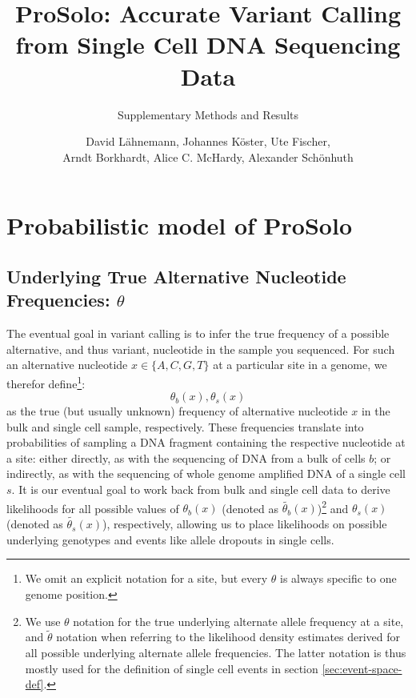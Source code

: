\documentclass[authoryear,preprint,11pt]{scrartcl}
\begin{document}
\title{ProSolo: Accurate Variant Calling from Single Cell DNA Sequencing Data}
\subtitle{Supplementary Methods and Results}

\author{David Lähnemann, Johannes Köster, Ute Fischer, \\ Arndt Borkhardt, Alice C. McHardy, Alexander Schönhuth}

\maketitle

\tableofcontents

\section{Probabilistic model of ProSolo}

\subsection{Underlying True Alternative Nucleotide Frequencies: $\theta$}
\label{sec.afs}

The eventual goal in variant calling is to infer the true frequency of a possible alternative, and thus variant, nucleotide in the sample you sequenced.
For such an alternative nucleotide $x\in\{A,C,G,T\}$ at a particular site in a genome, we therefor define\footnote{We omit an explicit notation for a site, but every $\theta$ is always specific to one genome position.}:
\begin{equation}
 \theta_{b}(x), \theta_{s}(x)
\end{equation}
as the true (but usually unknown) frequency of alternative nucleotide $x$ in the bulk and single cell sample, respectively.
These frequencies translate into probabilities of sampling a DNA fragment containing the respective nucleotide at a site:
either directly, as with the sequencing of DNA from a bulk of cells $b$;
or indirectly, as with the sequencing of whole genome amplified DNA of a single cell $s$.
It is our eventual goal to work back from bulk and single cell data to derive likelihoods for all possible values of $\theta_{b}(x)$ (denoted as $\tilde{\theta_b}(x)$)\footnote{We use $\theta$ notation for the true underlying alternate allele frequency at a site, and $\tilde{\theta}$ notation when referring to the likelihood density estimates derived for all possible underlying alternate allele frequencies. The latter notation is thus mostly used for the definition of single cell events in section \ref{sec:event-space-def}.} and $\theta_{s}(x)$ (denoted as $\tilde{\theta_s}(x)$), respectively, allowing us to place likelihoods on possible underlying genotypes and events like allele dropouts in single cells.\\
\end{document}
